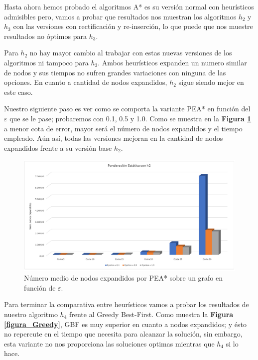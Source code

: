 \documentclass[runningheads]{llncs}
\begin{document}
Hasta ahora hemos probado el algoritmos A* es su versión normal con heurísticos admisibles pero, vamos a probar que resultados nos muestran los algoritmos $ h_2 $ y $ h_3 $ con las versiones con rectificación y re-inserción, lo que puede que nos muestre resultados no óptimos para $ h_3 $.

Para $ h_2 $ no hay mayor cambio al trabajar con estas nuevas versiones de los algoritmos ni tampoco para $ h_3 $. Ambos heurísticos expanden un numero similar de nodos y sus tiempos no sufren grandes variaciones con ninguna de las opciones. En cuanto a cantidad de nodos expandidos, $ h_2 $ sigue siendo mejor en este caso.

Nuestro siguiente paso es ver como se comporta la variante PEA* en función del $\varepsilon$ que se le pase; probaremos con 0.1, 0.5 y 1.0. Como se muestra en la \textbf{Figura \ref{figura_PEA}} a menor cota de error, mayor será el número de nodos expandidos y el tiempo empleado. Aún así, todas las versiones mejoran en la cantidad de nodos expandidos frente a su versión base $ h_2 $.

\begin{figure}
	\centering
	\includegraphics[width=\textwidth]{ejercicio5.jpg}
	\caption{Número medio de nodos expandidos por PEA* sobre un grafo en función de $\varepsilon$.} 
	\label{figura_PEA}
\end{figure}

Para terminar la comparativa entre heurísticos vamos a probar los resultados de nuestro algoritmo $ h_4 $ frente al Greedy Best-First. Como muestra la \textbf{Figura \ref{figura_Greedy}}, GBF es muy superior en cuanto a nodos expandidos; y ésto no repercute en el tiempo que necesita para alcanzar la solución, sin embargo, esta variante no nos proporciona las soluciones optimas mientras que $ h_4 $ si lo hace.
\end{document}
